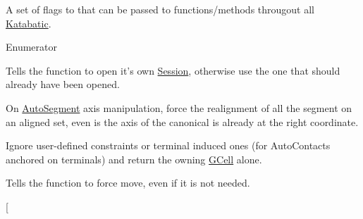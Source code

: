 A set of flags to that can be passed to functions/methods througout all \hyperlink{namespaceKatabatic}{Katabatic}. \begin{Desc}
\item[Enumerator]\par
\begin{description}
\item[{\em 
\hypertarget{namespaceKatabatic_a2af2ad6b6441614038caf59d04b3b217af314588109fcc5f5ee1c42e5fd4d0ed5}{Kb\-Open\-Session}\label{namespaceKatabatic_a2af2ad6b6441614038caf59d04b3b217af314588109fcc5f5ee1c42e5fd4d0ed5}
}]Tells the function to open it's own \hyperlink{classKatabatic_1_1Session}{Session}, otherwise use the one that should already have been opened. \item[{\em 
\hypertarget{namespaceKatabatic_a2af2ad6b6441614038caf59d04b3b217a45a219697151531a23e997b11118e08a}{Kb\-Realignate}\label{namespaceKatabatic_a2af2ad6b6441614038caf59d04b3b217a45a219697151531a23e997b11118e08a}
}]On \hyperlink{classKatabatic_1_1AutoSegment}{Auto\-Segment} axis manipulation, force the realignment of all the segment on an aligned set, even is the axis of the canonical is already at the right coordinate. \item[{\em 
\hypertarget{namespaceKatabatic_a2af2ad6b6441614038caf59d04b3b217af1d61226371622b8063fe47c63cd9dff}{Kb\-Native\-Constraints}\label{namespaceKatabatic_a2af2ad6b6441614038caf59d04b3b217af1d61226371622b8063fe47c63cd9dff}
}]Ignore user-\/defined constraints or terminal induced ones (for Auto\-Contacts anchored on terminals) and return the owning \hyperlink{classKatabatic_1_1GCell}{G\-Cell} alone. \item[{\em 
\hypertarget{namespaceKatabatic_a2af2ad6b6441614038caf59d04b3b217acf76914f1ec05633965f0ac6b1c89959}{Kb\-Force\-Move}\label{namespaceKatabatic_a2af2ad6b6441614038caf59d04b3b217acf76914f1ec05633965f0ac6b1c89959}
}]Tells the function to force move, even if it is not needed. \item[{\em 
}
\end{description}
\end{Desc}
